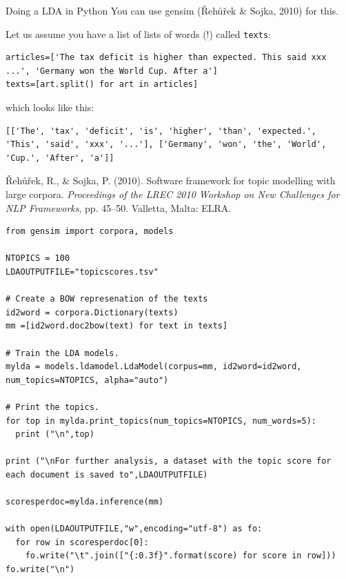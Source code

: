 \documentclass{beamer}
\begin{document}
\begin{frame}[fragile]{Doing a LDA in Python}
You can use gensim ({\v R}eh{\r u}{\v r}ek \& Sojka, 2010) for this.

Let us assume you have a list of lists of words (!) called \texttt{texts}:

\begin{lstlisting}
articles=['The tax deficit is higher than expected. This said xxx ...', 'Germany won the World Cup. After a']
texts=[art.split() for art in articles]
\end{lstlisting}
which looks like this:
\begin{lstlisting}
[['The', 'tax', 'deficit', 'is', 'higher', 'than', 'expected.', 'This', 'said', 'xxx', '...'], ['Germany', 'won', 'the', 'World', 'Cup.', 'After', 'a']]
\end{lstlisting}

\tiny{{\v R}eh{\r u}{\v r}ek, R., \& Sojka, P. (2010). Software framework for topic modelling with large corpora. \emph{Proceedings of the LREC 2010 Workshop on New Challenges for NLP Frameworks}, pp. 45–50. Valletta, Malta: ELRA. }

\end{frame}




\begin{frame}
\begin{lstlisting}
from gensim import corpora, models

NTOPICS = 100
LDAOUTPUTFILE="topicscores.tsv"

# Create a BOW represenation of the texts
id2word = corpora.Dictionary(texts)
mm =[id2word.doc2bow(text) for text in texts]

# Train the LDA models.
mylda = models.ldamodel.LdaModel(corpus=mm, id2word=id2word, num_topics=NTOPICS, alpha="auto")

# Print the topics.
for top in mylda.print_topics(num_topics=NTOPICS, num_words=5):
  print ("\n",top)

print ("\nFor further analysis, a dataset with the topic score for each document is saved to",LDAOUTPUTFILE)

scoresperdoc=mylda.inference(mm)

with open(LDAOUTPUTFILE,"w",encoding="utf-8") as fo:
  for row in scoresperdoc[0]:
    fo.write("\t".join(["{:0.3f}".format(score) for score in row]))
fo.write("\n")
\end{lstlisting}

\end{frame}
\end{document}
